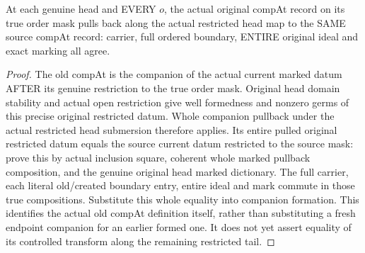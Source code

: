 \begin{theorem}
\label{hir:submersion-historical-masks-comp-at}
\leanok
At each genuine head and EVERY $o$, the actual original compAt record on its
true order mask pulls back along the actual restricted head map to the
SAME source compAt record: carrier, full ordered boundary, ENTIRE original
ideal and exact marking all agree.
\end{theorem}
\begin{proof}
The old compAt is the companion of the actual current marked datum AFTER
its genuine restriction to the true order mask. Original head domain
stability and actual open restriction give well formedness and nonzero
germs of this precise original restricted datum. Whole companion pullback
under the actual restricted head submersion therefore applies. Its entire
pulled original restricted datum equals the source current datum restricted
to the source mask: prove this by actual inclusion square, coherent whole
marked pullback composition, and the genuine original head marked
dictionary. The full carrier, each literal old/created boundary entry,
entire ideal and mark commute in those true compositions. Substitute this
whole equality into companion formation. This identifies the actual old
compAt definition itself, rather than substituting a fresh endpoint
companion for an earlier formed one. It does not yet assert equality of
its controlled transform along the remaining restricted tail.
\end{proof}

